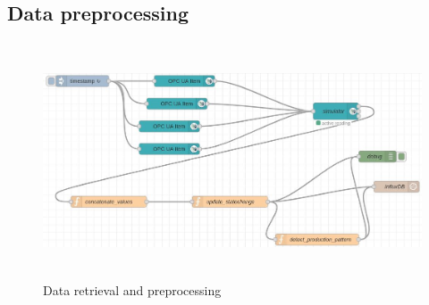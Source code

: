 \subsection{Data preprocessing}
\begin{figure}[H]
	\centering
	\includegraphics[height=7cm]{pic/node-RED.jpg}
	\caption{Data retrieval and preprocessing}
	\label{fig:Model-Component-Pattern}
\end{figure}






